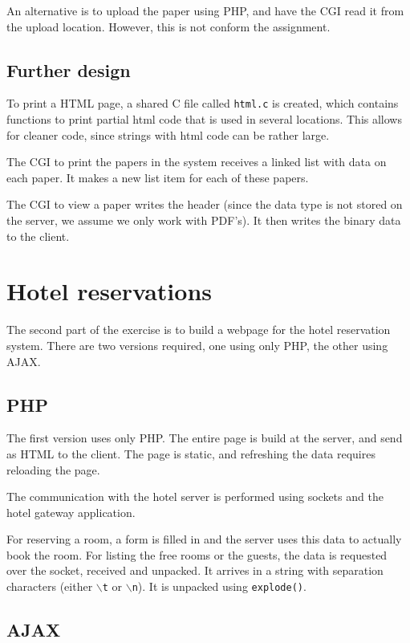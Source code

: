 \documentclass[a4paper]{article}
\begin{document}
An alternative is to upload the paper using PHP, and have the CGI read it from the upload location. However,
this is not conform the assignment.

\subsection{Further design}

To print a HTML page, a shared C file called \texttt{html.c} is created, which contains functions to print
partial html code that is used in several locations. This allows for cleaner code, since strings with
html code can be rather large.

The CGI to print the papers in the system receives a linked list with data on each paper. It makes a new
list item for each of these papers.

The CGI to view a paper writes the header (since the data type is not stored on the server, we assume we only
work with PDF's). It then writes the binary data to the client.

\section{Hotel reservations}

The second part of the exercise is to build a webpage for the hotel reservation system. There are two versions
required, one using only PHP, the other using AJAX.

\subsection{PHP}

The first version uses only PHP. The entire page is build at the server, and send as HTML to the client.
The page is static, and refreshing the data requires reloading the page.

The communication with the hotel server is performed using sockets and the hotel gateway application.

For reserving a room, a form is filled in and the server uses this data to actually book the room. For listing
the free rooms or the guests, the data is requested over the socket, received and unpacked. It arrives in a
string with separation characters (either \texttt{$\backslash$t} or \texttt{$\backslash$n}). It is unpacked using \texttt{explode()}.

\subsection{AJAX}
\end{document}

